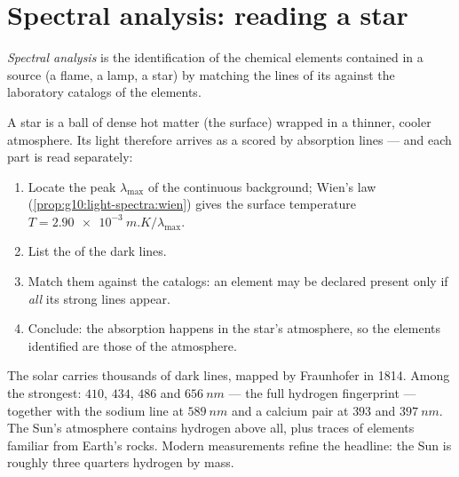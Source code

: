 \section{Spectral analysis: reading a star}

\begin{definition}\label{def:g10:light-spectra:analysis}
\emph{Spectral analysis} is the identification
of the chemical elements contained in a source (a flame, a lamp, a star)
by matching the lines of its  against the laboratory catalogs of
the elements.
\end{definition}

\begin{method}\label{met:g10:light-spectra:reading}
A star is a ball of dense hot matter (the surface) wrapped in a thinner,
cooler atmosphere. Its light therefore arrives as a 
scored by absorption lines --- and each part is read separately:
\begin{enumerate}
  \item Locate the peak $\lambda_{\max}$ of the continuous background;
        Wien's law (\cref{prop:g10:light-spectra:wien}) gives the surface
        temperature $T = \qty{2.90e-3}{m.K} / \lambda_{\max}$.
  \item List the  of the dark lines.
  \item Match them against the catalogs: an element may be declared
        present only if \emph{all} its strong lines appear.
  \item Conclude: the absorption happens in the star's atmosphere, so the
        elements identified are those of the atmosphere.
\end{enumerate}
\end{method}

\begin{example}\label{ex:g10:light-spectra:sunrecipe}
The solar  carries thousands of dark lines, mapped by Fraunhofer
in 1814. Among the strongest: $410$, $434$, $486$ and $\qty{656}{nm}$ ---
the full hydrogen fingerprint --- together with the sodium line at
$\qty{589}{nm}$ and a calcium pair at $393$ and $\qty{397}{nm}$. The
Sun's atmosphere contains hydrogen above all, plus traces of elements
familiar from Earth's rocks. Modern measurements refine the headline: the
Sun is roughly three quarters hydrogen by mass.
\end{example}

